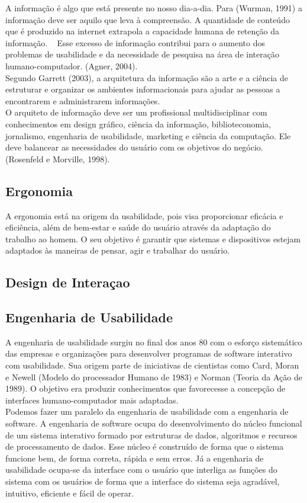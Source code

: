 A informação é algo que está presente no nosso dia-a-dia. Para (Wurman, 1991) a informação deve ser aquilo que leva à compreensão. A quantidade de conteúdo que é produzido na internet extrapola a capacidade humana de retenção da informação. ~\cite{rosa2012} Esse excesso de informação contribui para o aumento dos problemas de usabilidade e da necessidade de pesquisa na área de interação humano-computador. (Agner, 2004).\\

Segundo Garrett (2003), a arquitetura da informação são a arte e a ciência de estruturar e organizar os ambientes informacionais para ajudar as pessoas a encontrarem e administrarem informações.\\

O arquiteto de informação deve ser um profissional multidisciplinar com conhecimentos em design gráfico, ciência da informação, biblioteconomia, jornalismo, engenharia de usabilidade, marketing e ciência da computação. Ele deve balancear as necessidades do usuário com os objetivos do negócio. (Rosenfeld e Morville, 1998).

\subsection{Ergonomia}

A ergonomia está na origem da usabilidade, pois visa proporcionar eficácia e eficiência, além de bem-estar e saúde do usuário através da adaptação do trabalho ao homem. O seu objetivo é garantir que sistemas e dispositivos estejam adaptados às maneiras de pensar, agir e trabalhar do usuário. ~\cite{cybis2010}

\subsection{Design de Interaçao}

	


\subsection{Engenharia de Usabilidade}

A engenharia de usabilidade surgiu no final dos anos 80 com o esforço sistemático das empresas e organizações para desenvolver programas de software interativo com usabilidade. Sua origem parte de iniciativas de cientistas como Card, Moran e Newell (Modelo do processador Humano de 1983) e Norman (Teoria da Ação de 1989). O objetivo era produzir conhecimentos que favorecesse a concepção de interfaces humano-computador mais adaptadas. ~\cite{cybis2010}
\\
Podemos fazer um paralelo da engenharia de usabilidade com a engenharia de software. A engenharia de software ocupa do desenvolvimento do núcleo funcional de um sistema interativo formado por estruturas de dados, algoritmos e recursos de processamento de dados. Esse núcleo é construído de forma que o sistema funcione bem, de forma correta, rápida e sem erros. Já a engenharia de usabilidade ocupa-se da interface com o usuário que interliga as funções do sistema com os usuários de forma que a interface do sistema seja agradável, intuitivo, eficiente e fácil de operar.~\cite{cybis2010}

